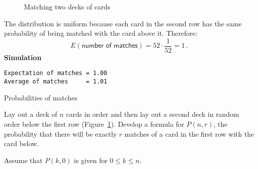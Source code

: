 \begin{figure}[tb]
\begin{center}
\end{center}
\caption{Matching two decks of cards}\label{f.cards}
\end{figure}
\solution{}

The distribution is uniform because each card in the second row has the same probability of being matched with the card above it. Therefore:
\[
E(\textsf{number of matches}) = 52\cdot \frac{1}{52} = 1\,.
\]
\textbf{Simulation}

\begin{verbatim}
Expectation of matches = 1.00
Average of matches     = 1.01
\end{verbatim}


\begin{prob}{Probabilities of matches}

Lay out a deck of $n$ cards in order and then lay out a second deck in random order below the first row (Figure~\ref{f.cards}). Develop a formula for $P(n,r)$, the probability that there will be exactly $r$ matches of a card in the first row with the card below.

Assume that $P(k,0)$ is given for $0\leq k\leq n$.
\end{prob}

